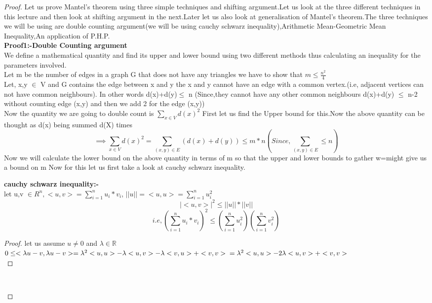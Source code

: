 \begin{proof}
Let us prove Mantel's theorem using three simple techniques and shifting argument.Let us look at the three different techniques in this lecture and then look at shifting argument in the next.Later let us also look at generalisation of Mantel's theorem.The three techniques  we will be using are double counting argument(we will be using cauchy schwarz inequality),Arithmetic Mean-Geometric Mean Inequality,An application of P.H.P.\\
\textbf{Proof1:-Double Counting argument}\\
We define a mathematical quantity and find its upper and lower bound using two different methods thus calculating an inequality for the parameters involved.\\
Let m be the number of edges in a graph G that does not have any triangles we have to show that $m \le \frac{n^2}{4}$\\
Let, x,y $\in$ V and G contains the edge between x and y the x and y cannot have an edge with a common vertex.(i.e, adjacent vertices can not have common neighbours).
In other words d(x)+d(y)$\le$ n (Since,they cannot have any other common neighbours d(x)+d(y) $\leq$ n-2 without counting edge (x,y) and then we add 2 for the edge (x,y))\\
Now the quantity we are going to double count is $\sum_{x \in V} d(x)^2$
First let us find the Upper bound for this.Now the above quantity can be thought as d(x) being summed d(X) times\\
$$\implies \sum_{x \in V}d(x)^2=\sum_{(x,y) \in E}(d(x)+d(y)) \leq m*n(Since,\sum_{(x,y)\in E} \leq n)$$
Now we will calculate the lower bound on the above quantity in terms of m so that the upper and lower bounds to gather w=might give us a bound on m
Now for this let us first take a look at cauchy schwarz inequality.\\
\begin{theorem}
\textbf{cauchy schwarz inequality:-}\\
let u,v $\in R^n, $$< u,v >=\sum_{i=1}^n
u_i*v_i$, $||u||=< u,u >=\sum_{i=1}^n u_i^2$\\
$$|< u,v >|^2 \leq ||u||*||v||$$
$$i.e,(\sum_{i=1}^n u_i*v_i)^2 \leq (\sum_{i=1}^n u_i^2)(\sum_{i=1}^n v_i^2)$$
\begin{proof}
let us assume $u \neq 0$ and $\lambda \in \mathbb{R}$\\
$0\leq <\lambda u-v ,\lambda u-v >=\lambda^2 <u,u> -\lambda <u,v> -\lambda <v,u> +<v,v>\\
=\lambda^2 <u,u> -2\lambda <u,v>+<v,v>$\\

\end{proof}$$
\end{theorem}
\end{proof}
